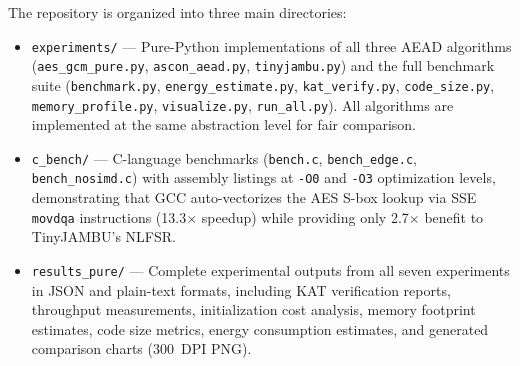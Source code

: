 \documentclass[11pt,a4paper]{article}
\begin{document}
The repository is organized into three main directories:

\begin{itemize}[leftmargin=*]
    \item \texttt{experiments/} --- Pure-Python implementations of all three AEAD algorithms (\texttt{aes\_gcm\_pure.py}, \texttt{ascon\_aead.py}, \texttt{tinyjambu.py}) and the full benchmark suite (\texttt{benchmark.py}, \texttt{energy\_estimate.py}, \texttt{kat\_verify.py}, \texttt{code\_size.py}, \texttt{memory\_profile.py}, \texttt{visualize.py}, \texttt{run\_all.py}). All algorithms are implemented at the same abstraction level for fair comparison.
    \item \texttt{c\_bench/} --- C-language benchmarks (\texttt{bench.c}, \texttt{bench\_edge.c}, \texttt{bench\_nosimd.c}) with assembly listings at {\tt -O0} and {\tt -O3} optimization levels, demonstrating that GCC auto-vectorizes the AES S-box lookup via SSE {\tt movdqa} instructions (13.3$\times$ speedup) while providing only 2.7$\times$ benefit to TinyJAMBU's NLFSR.
    \item \texttt{results\_pure/} --- Complete experimental outputs from all seven experiments in JSON and plain-text formats, including KAT verification reports, throughput measurements, initialization cost analysis, memory footprint estimates, code size metrics, energy consumption estimates, and generated comparison charts (300~DPI PNG).
\end{itemize}
\end{document}
